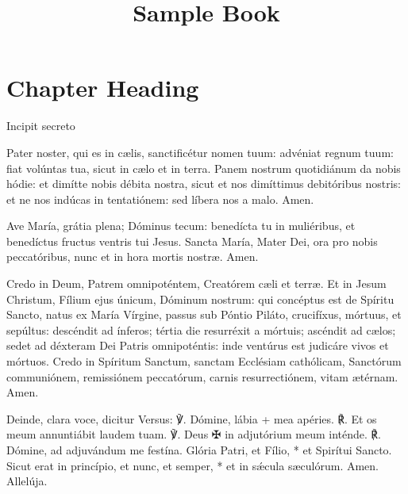 \documentclass[10pt,twoside,final,a5paper]{memoir}
\title{Sample Book}
\begin{document}


\frontmatter

\mainmatter

\chapter*{Chapter Heading}


Incipit
secreto

Pater noster, qui es in cælis, sanctificétur nomen tuum: advéniat regnum tuum: fiat volúntas tua, sicut in cælo et in terra. Panem nostrum quotidiánum da nobis hódie: et dimítte nobis débita nostra, sicut et nos dimíttimus debitóribus nostris: et ne nos indúcas in tentatiónem: sed líbera nos a malo. Amen.

Ave María, grátia plena; Dóminus tecum: benedícta tu in muliéribus, et benedíctus fructus ventris tui Jesus. Sancta María, Mater Dei, ora pro nobis peccatóribus, nunc et in hora mortis nostræ. Amen.

Credo in Deum, Patrem omnipoténtem, Creatórem cæli et terræ. Et in Jesum Christum, Fílium ejus únicum, Dóminum nostrum: qui concéptus est de Spíritu Sancto, natus ex María Vírgine, passus sub Póntio Piláto, crucifíxus, mórtuus, et sepúltus: descéndit ad ínferos; tértia die resurréxit a mórtuis; ascéndit ad cælos; sedet ad déxteram Dei Patris omnipoténtis: inde ventúrus est judicáre vivos et mórtuos. Credo in Spíritum Sanctum, sanctam Ecclésiam cathólicam, Sanctórum communiónem, remissiónem peccatórum, carnis resurrectiónem, vitam ætérnam. Amen.

Deinde, clara voce, dicitur Versus:
℣. Dómine, lábia + mea apéries.
℟. Et os meum annuntiábit laudem tuam.
℣. Deus ✠ in adjutórium meum inténde.
℟. Dómine, ad adjuvándum me festína.
Glória Patri, et Fílio, * et Spirítui Sancto.
Sicut erat in princípio, et nunc, et semper, * et in sǽcula sæculórum. Amen.
Allelúja.



\end{document}
